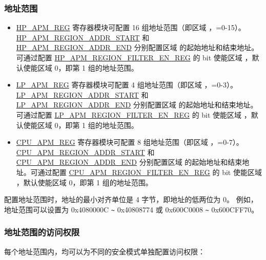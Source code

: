 \documentclass[main\_\_CN.tex]{subfiles}
\begin{document}
\subsubsection{地址范围}
\begin{itemize}
    \item \hyperref[sec:permctrl-reg-hp]{HP\_APM\_REG} 寄存器模块可配置 16 组地址范围（即区域 ，=0-15）。\hyperref[regdesc:HPAPMREGIONNADDRSTARTREG]{HP\_APM\_REGION\_ADDR\_START} 和 \hyperref[regdesc:HPAPMREGIONNADDRENDREG]{HP\_APM\_REGION\_ADDR\_END} 分别配置区域  的起始地址和结束地址。可通过配置 \hyperref[fielddesc:HPAPMREGIONFILTEREN]{HP\_APM\_REGION\_FILTER\_EN\_REG} 的 bit  使能区域 ，默认使能区域 0，即第 1 组的地址范围。

    \item \hyperref[sec:permctrl-reg-lp]{LP\_APM\_REG} 寄存器模块可配置 4 组地址范围（即区域 ，=0-3）。\hyperref[fielddesc:LPAPMREGIONNADDRSTART]{LP\_APM\_REGION\_ADDR\_START} 和 \hyperref[fielddesc:LPAPMREGIONNADDREND]{LP\_APM\_REGION\_ADDR\_END} 分别配置区域  的起始地址和结束地址。可通过配置 \hyperref[fielddesc:LPAPMREGIONFILTEREN]{LP\_APM\_REGION\_FILTER\_EN\_REG} 的 bit  使能区域 ，默认使能区域 0，即第 1 组的地址范围。

    \item \hyperref[sec:permctrl-reg-cpu]{CPU\_APM\_REG} 寄存器模块可配置 8 组地址范围（即区域 ，=0-7）。\hyperref[fielddesc:CPUAPMREGIONNADDRSTART]{CPU\_APM\_REGION\_ADDR\_START} 和 \hyperref[fielddesc:CPUAPMREGIONNADDREND]{CPU\_APM\_REGION\_ADDR\_END} 分别配置区域  的起始地址和结束地址。可通过配置 \hyperref[fielddesc:CPUAPMREGIONFILTEREN]{CPU\_APM\_REGION\_FILTER\_EN\_REG} 的 bit  使能区域 ，默认使能区域 0，即第 1 组的地址范围。
\end{itemize}

配置地址范围时，地址的最小对齐单位是 4 字节，即地址的低两位为 0。 例如，地址范围可以设置为 0x4080000C \verb+~+ 0x40808774 或 0x600C0008 \verb+~+ 0x600CFF70。

\subsubsection{地址范围的访问权限}

每个地址范围内，均可以为不同的安全模式单独配置访问权限：
\end{document}
